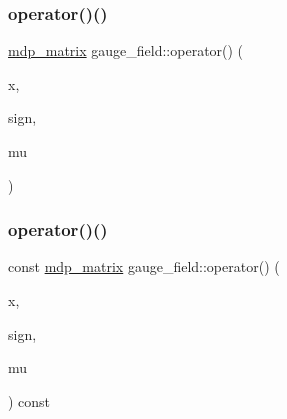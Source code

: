 \mbox{\label{classgauge__field_a8d68963fa439cf58c3ac16c043523010}} 
\subsubsection{\texorpdfstring{operator()()}{operator()()}\hspace{0.1cm}{\footnotesize\ttfamily [5/7]}}
{\footnotesize\ttfamily \hyperlink{classmdp__matrix}{mdp\+\_\+matrix} gauge\+\_\+field\+::operator() (\begin{DoxyParamCaption}\item[{\hyperlink{mdp__compatibility__macros_8h_aa6f1179c424e48adef1cedf7c436eb75}{site}}]{x,  }\item[{int}]{sign,  }\item[{int}]{mu }\end{DoxyParamCaption})\hspace{0.3cm}{\ttfamily [inline]}}

\mbox{\label{classgauge__field_a330c596f8cf0371a653404eb5cdde6ce}} 
\subsubsection{\texorpdfstring{operator()()}{operator()()}\hspace{0.1cm}{\footnotesize\ttfamily [6/7]}}
{\footnotesize\ttfamily const \hyperlink{classmdp__matrix}{mdp\+\_\+matrix} gauge\+\_\+field\+::operator() (\begin{DoxyParamCaption}\item[{\hyperlink{mdp__compatibility__macros_8h_aa6f1179c424e48adef1cedf7c436eb75}{site}}]{x,  }\item[{int}]{sign,  }\item[{int}]{mu }\end{DoxyParamCaption}) const\hspace{0.3cm}{\ttfamily [inline]}}

\mbox{\label{classgauge__field_aa074a28da4cc4f762d0e7883a09a23f0}} 
